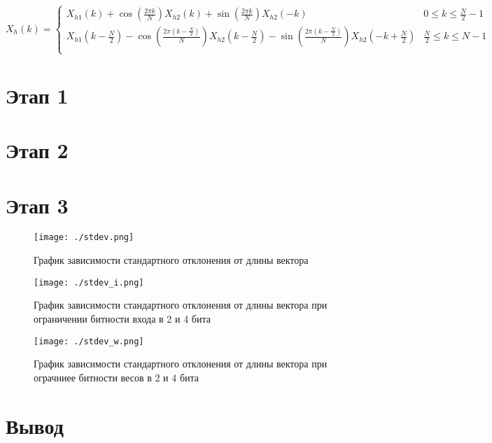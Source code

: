 \documentclass[12pt, a4paper] {ncc}
\begin{document}
$X_h(k) = \begin{cases}
	X_{h1}(k) + \cos(\frac{2\pi k} N) X_{h2}(k) + \sin(\frac{2\pi k} N) X_{h2}(-k) 		 & 0 \leq k \leq \frac N 2 - 1 \\
	X_{h1}(k - \frac{N}{2}) - \cos(\frac{2\pi (k - \frac N 2)} N) X_{h2}(k - \frac N 2)
							- \sin(\frac{2\pi (k - \frac N 2)} N) X_{h2}(-k + \frac N 2) & \frac N 2 \leq k \leq N - 1 \\

\end{cases}
$

\section*{Этап 1}



\section*{Этап 2}



\section*{Этап 3}

\begin{figure}[ht!]
    \texttt{[image: ./stdev.png]}
    \caption{График зависимости стандартного отклонения от длины вектора}
	\label{fig:vec}
\end{figure}

\begin{figure}[ht!]
    \texttt{[image: ./stdev\_i.png]}
    \caption{График зависимости стандартного отклонения от длины вектора при ограничении битности входа в 2 и 4 бита}
	\label{fig:input}
\end{figure}

\begin{figure}[ht!]
    \texttt{[image: ./stdev\_w.png]}
    \caption{График зависимости стандартного отклонения от длины вектора при ограчниее битности весов в 2 и 4 бита}
	\label{fig:weight}
\end{figure}

\section*{Вывод}
\end{document}
